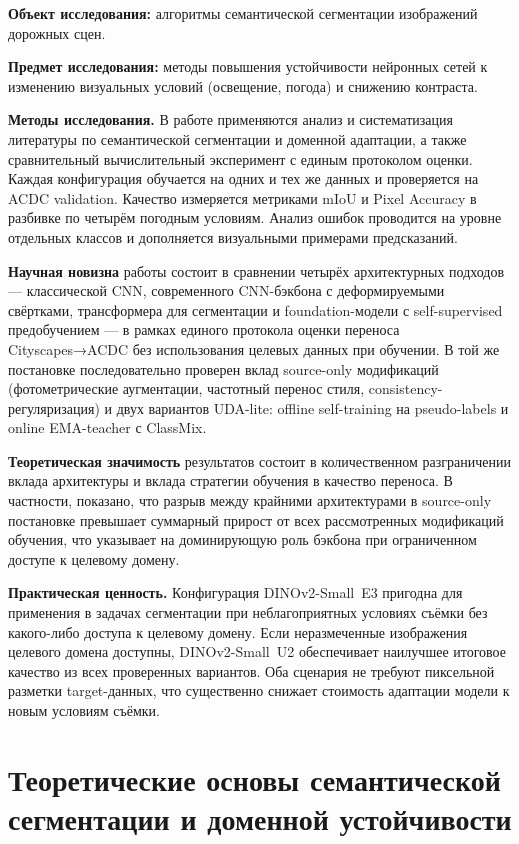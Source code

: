 \documentclass[14pt,a4paper]{extarticle}
\begin{document}
\textbf{Объект исследования:} алгоритмы семантической сегментации изображений дорожных сцен.

\textbf{Предмет исследования:} методы повышения устойчивости нейронных сетей к изменению визуальных условий (освещение, погода) и снижению контраста.

\textbf{Методы исследования.} В работе применяются анализ и систематизация литературы по семантической сегментации и доменной адаптации, а также сравнительный вычислительный эксперимент с единым протоколом оценки. Каждая конфигурация обучается на одних и тех же данных и проверяется на ACDC validation. Качество измеряется метриками mIoU и Pixel Accuracy в разбивке по четырём погодным условиям. Анализ ошибок проводится на уровне отдельных классов и дополняется визуальными примерами предсказаний.

\textbf{Научная новизна} работы состоит в сравнении четырёх архитектурных подходов --- классической CNN, современного CNN-бэкбона с деформируемыми свёртками, трансформера для сегментации и foundation-модели с self-supervised предобучением --- в рамках единого протокола оценки переноса Cityscapes→ACDC без использования целевых данных при обучении. В той же постановке последовательно проверен вклад source-only модификаций (фотометрические аугментации, частотный перенос стиля, consistency-регуляризация) и двух вариантов UDA-lite: offline self-training на pseudo-labels и online EMA-teacher с ClassMix.

\textbf{Теоретическая значимость} результатов состоит в количественном разграничении вклада архитектуры и вклада стратегии обучения в качество переноса. В частности, показано, что разрыв между крайними архитектурами в source-only постановке превышает суммарный прирост от всех рассмотренных модификаций обучения, что указывает на доминирующую роль бэкбона при ограниченном доступе к целевому домену.

\textbf{Практическая ценность.} Конфигурация DINOv2-Small~E3 пригодна для применения в задачах сегментации при неблагоприятных условиях съёмки без какого-либо доступа к целевому домену. Если неразмеченные изображения целевого домена доступны, DINOv2-Small~U2 обеспечивает наилучшее итоговое качество из всех проверенных вариантов. Оба сценария не требуют пиксельной разметки target-данных, что существенно снижает стоимость адаптации модели к новым условиям съёмки.

\newpage

\section{Теоретические основы семантической сегментации и доменной устойчивости}
\end{document}
